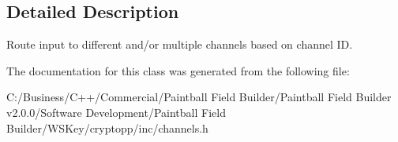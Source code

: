 \subsection{Detailed Description}
Route input to different and/or multiple channels based on channel ID. 

The documentation for this class was generated from the following file:\begin{DoxyCompactItemize}
\item 
C:/Business/C++/Commercial/Paintball Field Builder/Paintball Field Builder v2.0.0/Software Development/Paintball Field Builder/WSKey/cryptopp/inc/channels.h\end{DoxyCompactItemize}
